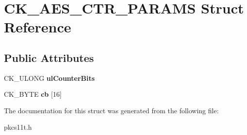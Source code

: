 \hypertarget{struct_c_k___a_e_s___c_t_r___p_a_r_a_m_s}{}\section{C\+K\+\_\+\+A\+E\+S\+\_\+\+C\+T\+R\+\_\+\+P\+A\+R\+A\+MS Struct Reference}
\label{struct_c_k___a_e_s___c_t_r___p_a_r_a_m_s}
\subsection*{Public Attributes}
\begin{DoxyCompactItemize}
\item 
\mbox{\label{struct_c_k___a_e_s___c_t_r___p_a_r_a_m_s_a54e9e91f82b31a9cbe343adaa31e3a3a}} 
C\+K\+\_\+\+U\+L\+O\+NG {\bfseries ul\+Counter\+Bits}
\item 
\mbox{\label{struct_c_k___a_e_s___c_t_r___p_a_r_a_m_s_ac56cd88bc06e232dd34f41843c7f8498}} 
C\+K\+\_\+\+B\+Y\+TE {\bfseries cb} \mbox{[}16\mbox{]}
\end{DoxyCompactItemize}


The documentation for this struct was generated from the following file\+:\begin{DoxyCompactItemize}
\item 
pkcs11t.\+h\end{DoxyCompactItemize}
